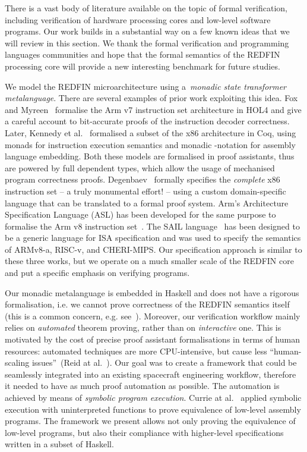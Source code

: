 
There is a vast body of literature available on the topic of formal verification,
including verification of hardware processing cores and low-level software programs.
Our work builds in a substantial way on a few known ideas that we will review in
this section. We thank the formal verification and programming languages
communities and hope that the formal semantics of the REDFIN processing core will
provide a new interesting benchmark for future studies.

We model the REDFIN microarchitecture using a~\emph{monadic state transformer
metalanguage}. There are several examples of prior work exploiting this idea.
Fox and Myreen~\cite{fox2010trustworthy} formalise the Arm v7 instruction
set architecture in HOL4 and give a careful account to bit-accurate proofs of
the instruction decoder correctness. Later, Kennedy et al.~\cite{kennedy2013coq}
formalised a subset of the x86 architecture in Coq, using monads for instruction
execution semantics and monadic -notation for assembly language embedding.
Both these models are formalised in proof assistants, thus are powered by full
dependent types, which allow the usage of mechanised program correctness proofs.
Degenbaev~\cite{degenbaev2012formal} formally specifies the \emph{complete} x86
instruction set -- a truly monumental effort! -- using a custom domain-specific
language that can be translated to a formal proof system. Arm's Architecture
Specification Language (ASL) has been developed for the same purpose to formalise the
Arm v8 instruction set~\cite{reid2016cav}. The SAIL language~\cite{SAIL-lang} has
been designed to be a generic language for ISA specification and was used to
specify the semantics of ARMv8-a, RISC-v, and CHERI-MIPS.
Our specification approach is similar to these three works, but we operate on a much smaller scale of the REDFIN core and put a specific emphasis on verifying programs.

Our monadic metalanguage is embedded in Haskell and does not have a rigorous
formalisation, i.e. we cannot prove correctness of the REDFIN semantics
itself (this is a common concern, e.g. see~\cite{reid2017oopsla}). Moreover, our
verification workflow mainly relies on \emph{automated} theorem proving, rather
than on \emph{interactive} one. This is motivated by the cost of precise proof
assistant formalisations in terms of human resources: automated techniques are
more CPU-intensive, but cause less ``human-scaling issues''~(Reid at
al.~\cite{reid2016cav}). Our goal was to create a framework that could be seamlessly
integrated into an existing spacecraft engineering workflow, therefore it needed
to have as much proof automation as possible. The automation is achieved by means
of \emph{symbolic program execution}. Currie at al.~\cite{Currie2006} applied
symbolic execution with uninterpreted functions to prove equivalence of low-level
assembly programs. The framework we present allows not only proving the
equivalence of low-level programs, but also their compliance with higher-level
specifications written in a subset of Haskell.

